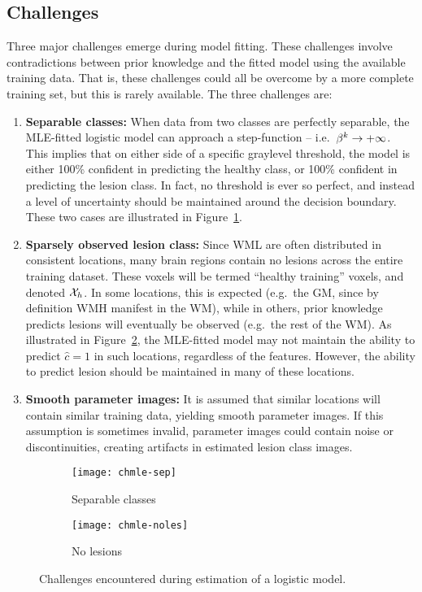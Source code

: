 \subsection{Challenges}\label{ss:vlr-chmle}
Three major challenges emerge during model fitting.
These challenges involve contradictions between prior knowledge
and the fitted model using the available training data.
That is, these challenges could all be overcome by a more complete training set,
but this is rarely available.
The three challenges are:
\begin{enumerate}
  \item\label{chmle:separable} \textbf{Separable classes:}
  When data from two classes are perfectly separable,
  the MLE-fitted logistic model can approach a step-function -- i.e.\ $\beta^k\rightarrow+\infty$.
  This implies that on either side of a specific graylevel threshold,
  the model is either 100\% confident in predicting the healthy class,
  or 100\% confident in predicting the lesion class.
  In fact, no threshold is ever so perfect,
  and instead a level of uncertainty should be maintained around the decision boundary.
  These two cases are illustrated in Figure~\ref{fig:chmle-sep}.
  \item\label{chmle:sparse} \textbf{Sparsely observed lesion class:} 
  Since WML are often distributed in consistent locations,
  many brain regions contain no lesions across the entire training dataset.
  These voxels will be termed ``healthy training'' voxels, and denoted $\mathcal{X}_{h}$.
  In some locations, this is expected
  (e.g.\ the GM, since by definition WMH manifest in the WM),
  while in others, prior knowledge predicts lesions will eventually be observed
  (e.g.\ the rest of the WM).
  As illustrated in Figure~\ref{fig:chmle-noles},
  the MLE-fitted model may not maintain the ability to predict $\hat{c} = 1$ in such locations,
  regardless of the features.
  However, the ability to predict lesion should be maintained in many of these locations.
  \item\label{chmle:noisy} \textbf{Smooth parameter images:} 
  It is assumed that similar locations will contain similar training data,
  yielding smooth parameter images.
  If this assumption is sometimes invalid,
  parameter images could contain noise or discontinuities,
  creating artifacts in estimated lesion class images.
\end{enumerate}
\begin{figure}
  \centering
  \begin{subfigure}{\plotwidth}
    \texttt{[image: chmle-sep]}
    \caption{Separable classes}%
    \label{fig:chmle-sep}
  \end{subfigure}
  \begin{subfigure}{\plotwidth}
    \texttt{[image: chmle-noles]}
    \caption{No lesions}%
     \label{fig:chmle-noles}
   \end{subfigure}
  \caption{Challenges encountered during estimation of a logistic model.}%
  \label{fig:chmle}
\end{figure}
